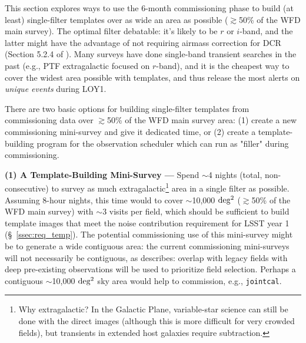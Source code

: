 \documentclass[DM,lsstdraft,toc]{lsstdoc}
\begin{document}
This section explores ways to use the 6-month commissioning phase to build (at least) single-filter templates over as wide an area as possible ($\gtrsim$50\% of the WFD main survey). The optimal filter debatable: it's likely to be $r$ or $i$-band, and the latter might have the advantage of not requiring airmass correction for DCR (Section 5.2.4 of ). Many surveys have done single-band transient searches in the past (e.g., PTF extragalactic focused on $r$-band), and it is the cheapest way to cover the widest area possible with templates, and thus release the most alerts on {\em unique events} during LOY1. %

There are two basic options for building single-filter templates from commissioning data over $\gtrsim$50\% of the WFD main survey area: (1) create a new commissioning mini-survey and give it dedicated time, or (2) create a template-building program for the observation scheduler which can run as "filler" during commissioning.

{\bf (1) A Template-Building Mini-Survey ---} Spend $\sim$4 nights (total, non-consecutive) to survey as much extragalactic\footnote{Why extragalactic? In the Galactic Plane, variable-star science can still be done with the direct images (although this is more difficult for very crowded fields), but transients in extended host galaxies require subtraction.} area in a single filter as possible. Assuming 8-hour nights, this time would to cover $\sim$10,000 $\rm deg^2$ ($\gtrsim$50\% of the WFD main survey) with $\sim$3 visits per field, which should be sufficient to build template images that meet the noise contribution requirement for LSST year 1 (\S~\ref{ssec:req_temp}). The potential commissioning use of this mini-survey might be to generate a wide contiguous area: the current commissioning mini-surveys will not necessarily be contiguous, as  describes: overlap with legacy fields with deep pre-existing observations will be used to prioritize field selection. Perhaps a contiguous $\sim$10,000 $\rm deg^2$ sky area would help to commission, e.g., {\tt jointcal}.
\end{document}
